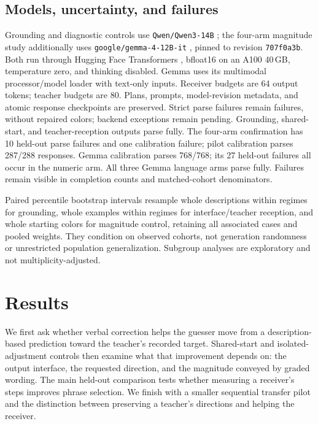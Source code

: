 \documentclass[11pt]{article}
\begin{document}
\subsection{Models, uncertainty, and failures}
Grounding and diagnostic controls use \texttt{Qwen/Qwen3-14B}
\citep{yang2025qwen3}; the four-arm magnitude study additionally uses
\texttt{google/gemma-4-12B-it} \citep{gemmateam2026gemma4},
pinned to revision \texttt{707f0a3b}.
Both run through Hugging Face Transformers \citep{wolf2020transformers},
bfloat16 on an A100 40\,GB, temperature zero, and thinking disabled.
Gemma uses its multimodal processor/model loader with text-only inputs.
Receiver budgets are
64 output tokens; teacher budgets are 80. Plans, prompts, model-revision
metadata, and atomic response checkpoints are preserved.
Strict parse failures remain failures, without repaired colors; backend
exceptions remain pending. Grounding, shared-start, and teacher-reception
outputs parse fully. The four-arm confirmation has 10 held-out parse failures
and one calibration failure; pilot calibration parses 287/288 responses.
Gemma calibration parses 768/768; its 27 held-out failures all occur in the
numeric arm. All three Gemma language arms parse fully.
Failures remain visible in completion counts and matched-cohort denominators.

Paired percentile bootstrap intervals resample whole descriptions within
regimes for grounding, whole examples within regimes for interface/teacher
reception, and whole starting colors for magnitude control,
retaining all associated cases and pooled weights. They condition on observed
cohorts, not generation randomness or unrestricted population generalization.
Subgroup analyses are exploratory and not multiplicity-adjusted.

\section{Results}
\label{sec:results}

We first ask whether verbal correction helps the guesser move from a
description-based prediction toward the teacher's recorded target.
Shared-start and isolated-adjustment controls then examine what that
improvement depends on: the output interface, the requested direction,
and the magnitude conveyed by graded wording. The main held-out comparison
tests whether measuring a receiver's steps improves phrase selection.
We finish with a smaller sequential transfer pilot and the distinction
between preserving a teacher's directions and helping the receiver.
\end{document}
